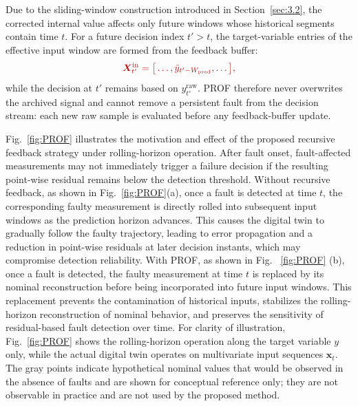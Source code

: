 \documentclass[a4paper,10pt]{cas-sc}%
\newcommand{\rev}[1]{\textcolor{revisionred}{#1}}
\begin{document}
\rev{Due to the sliding-window construction introduced in Section~\ref{sec:3.2}, the corrected internal value affects only future windows whose historical segments contain time $t$. For a future decision index $t'>t$, the target-variable entries of the effective input window are formed from the feedback buffer:}
\begin{equation}
	{\color{revisionred}\boldsymbol{X}_{t'}^{\mathrm{in}}
	=\big[\ldots,\tilde y_{t'-W_{\mathrm{pred}}},\ldots\big],}
	\label{eq:recursive_window}
\end{equation}
\rev{while the decision at $t'$ remains based on $y_{t'}^{\mathrm{raw}}$. PROF therefore never overwrites the archived signal and cannot remove a persistent fault from the decision stream: each new raw sample is evaluated before any feedback-buffer update.}

Fig.~\ref{fig:PROF} illustrates the motivation and effect of the proposed recursive feedback strategy under rolling-horizon operation. After fault onset, fault-affected measurements may not immediately trigger a failure decision if the resulting point-wise residual remains below the detection threshold. Without recursive feedback, as shown in Fig.~\ref{fig:PROF}(a), once a fault is detected at time $t$, the corresponding faulty measurement is directly rolled into subsequent input windows as the prediction horizon advances. This causes the digital twin to gradually follow the faulty trajectory, leading to error propagation and a reduction in point-wise residuals at later decision instants, which may compromise detection reliability.
With PROF, as shown in Fig. ~\ref{fig:PROF} (b), once a fault is detected, the faulty measurement at time $t$ is replaced by its nominal reconstruction before being incorporated into future input windows. This replacement prevents the contamination of historical inputs, stabilizes the rolling-horizon reconstruction of nominal behavior, and preserves the sensitivity of residual-based fault detection over time.
For clarity of illustration, Fig.~\ref{fig:PROF} shows the rolling-horizon operation along the target variable $y$ only, while the actual digital twin operates on multivariate input sequences $\boldsymbol{x}_t$. The gray points indicate hypothetical nominal values that would be observed in the absence of faults and are shown for conceptual reference only; they are not observable in practice and are not used by the proposed method.
\end{document}
